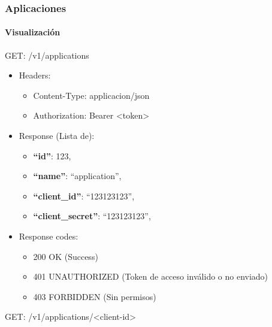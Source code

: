 \documentclass[12pt,a4paperpaper,]{report}
\providecommand{\tightlist}{%
  \setlength{\itemsep}{0pt}\setlength{\parskip}{0pt}}
\let\oldparagraph\paragraph
\renewcommand{\paragraph}[1]{\oldparagraph{#1}\mbox{}}
\begin{document}
\subsubsection{Aplicaciones}\label{aplicaciones}

\paragraph{Visualización}\label{visualizaciuxf3n-2}

GET: /v1/applications

\begin{itemize}
\tightlist
\item
  Headers:

  \begin{itemize}
  \tightlist
  \item
    Content-Type: applicacion/json
  \item
    Authorization: Bearer \textless{}token\textgreater{}
  \end{itemize}
\item
  Response (Lista de):

  \begin{itemize}
  \tightlist
  \item
    \textbf{``id''}: 123,
  \item
    \textbf{``name''}: ``application'',
  \item
    \textbf{``client\_id''}: ``123123123'',
  \item
    \textbf{``client\_secret''}: ``123123123'',
  \end{itemize}
\item
  Response codes:

  \begin{itemize}
  \tightlist
  \item
    200 OK (Success)
  \item
    401 UNAUTHORIZED (Token de acceso inválido o no enviado)
  \item
    403 FORBIDDEN (Sin permisos)
  \end{itemize}
\end{itemize}

GET: /v1/applications/\textless{}client-id\textgreater{}
\end{document}
